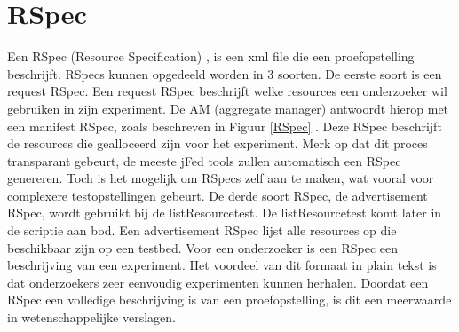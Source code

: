 \section{RSpec}
\npar
Een RSpec (Resource Specification) , is een xml file die een proefopstelling beschrijft\citep{geni-RSpec}. 
RSpecs kunnen opgedeeld worden in 3 soorten. De eerste soort is een request RSpec. Een request RSpec beschrijft welke resources een onderzoeker wil gebruiken in zijn experiment. De AM (aggregate manager) antwoordt hierop met een manifest RSpec, zoals beschreven in Figuur \ref{RSpec} . Deze RSpec beschrijft de resources die gealloceerd zijn voor het experiment. Merk op dat dit proces transparant gebeurt, de meeste jFed tools zullen automatisch een RSpec genereren. Toch is het mogelijk om RSpecs zelf aan te maken, wat vooral voor complexere testopstellingen gebeurt.
\clearpage
\npar
De derde soort RSpec, de advertisement RSpec, wordt gebruikt bij de listResourcetest. De listResourcetest komt later in de scriptie aan bod. Een advertisement RSpec lijst alle resources op die beschikbaar zijn op een testbed.
\npar
Voor een onderzoeker is een RSpec een beschrijving van een experiment. Het voordeel van dit formaat in plain tekst is dat onderzoekers zeer eenvoudig experimenten kunnen herhalen. Doordat een RSpec een volledige beschrijving is van een proefopstelling, is dit een meerwaarde in wetenschappelijke verslagen.
